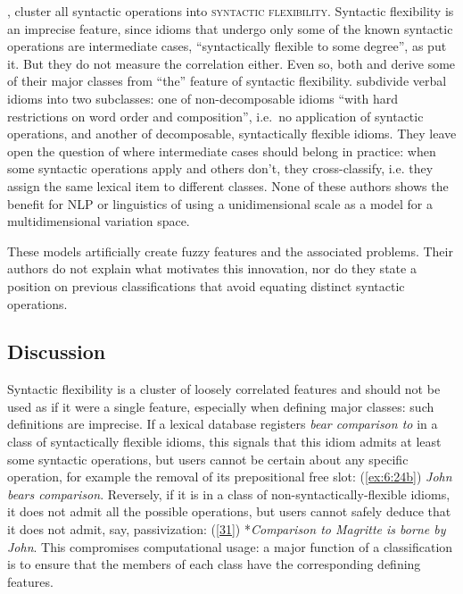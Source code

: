 \documentclass[output=paper]{langsci/langscibook}
\begin{document}
\citet[6]{Sag:2002}, \citet[278]{Baldwin2010} cluster all syntactic operations 
into \textsc{syntactic flexibility}. Syntactic flexibility is an imprecise feature, since idioms that undergo only some of the known syntactic operations are intermediate cases, “syntactically flexible to some degree”, as \cite{Sag:2002} put it. But they do not measure the correlation either. Even so, both \cite[3]{Sag:2002}  and \citet[279]{Baldwin2010} derive some of their major classes from “the” feature of syntactic flexibility. \cite{Baldwin2010}  subdivide verbal idioms into two subclasses: one of non-decomposable idioms “with hard restrictions on word order and composition”, i.e.~no application of syntactic operations, and another of decomposable, syntactically flexible idioms. They leave open the question of where intermediate cases should belong in practice: when some syntactic operations apply and others don’t, they cross-classify, i.e. they assign the same lexical item to different classes. None of these authors shows the benefit for NLP or linguistics of using a unidimensional scale as a model for a multidimensional variation space.

These models artificially create fuzzy features and the associated problems. Their authors do not explain what motivates this innovation, nor do they state a position on previous classifications that avoid equating distinct syntactic operations.

\subsection{Discussion}
\label{syntacticflexibility}

Syntactic flexibility is a cluster of loosely correlated features and should not be used as if it were a single feature, especially when defining major classes: such definitions are imprecise. If a lexical database registers \textit{bear comparison to} in a class of syntactically flexible idioms, this signals that this idiom admits at least some syntactic operations, 
but users cannot be certain about any specific operation, for example the removal of its prepositional free slot: (\ref{ex:6:24b}) \textit{John bears comparison}. Reversely, if it is in a class of non-syntactically-flexible idioms, it does not admit all the possible operations, but users cannot safely deduce that it does not admit, say, passivization: (\ref{31}) *\textit{Comparison to Magritte is borne by John}. This compromises computational usage: a major function of a classification is to ensure that the members of each class have the corresponding defining features.
\end{document}
